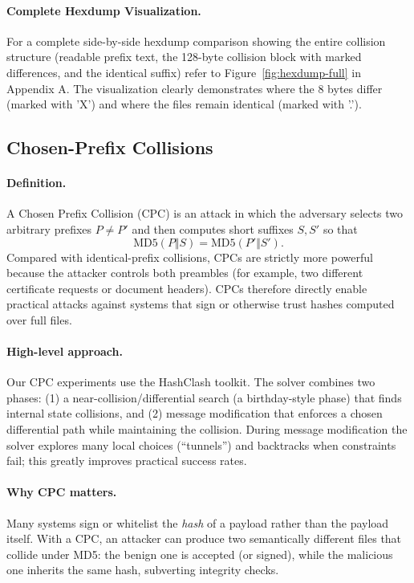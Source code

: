\documentclass[runningheads]{llncs}
\begin{document}
    \paragraph{Complete Hexdump Visualization.}
    For a complete side-by-side hexdump comparison showing the entire collision structure (readable prefix text, the 128-byte collision block with marked differences, and the identical suffix) refer to Figure~\ref{fig:hexdump-full} in Appendix A. The visualization clearly demonstrates where the 8 bytes differ (marked with 'X') and where the files remain identical (marked with '.').

    \subsection{Chosen-Prefix Collisions}\label{sec:cpc}
    \paragraph{Definition.}
    A Chosen Prefix Collision (CPC) is an attack in which the adversary selects two arbitrary prefixes \(P\neq P'\) and then computes short suffixes \(S,S'\) so that
    \[
        \mathrm{MD5}(P\Vert S)=\mathrm{MD5}(P'\Vert S').
    \]
    Compared with identical-prefix collisions, CPCs are strictly more powerful because the attacker controls both preambles (for example, two different certificate requests or document headers). CPCs therefore directly enable practical attacks against systems that sign or otherwise trust hashes computed over full files.

    \paragraph{High-level approach.}
    Our CPC experiments use the HashClash toolkit. The solver combines two phases: (1) a near-collision/differential search (a birthday-style phase) that finds internal state collisions, and (2) message modification that enforces a chosen differential path while maintaining the collision. During message modification the solver explores many local choices (“tunnels”) and backtracks when constraints fail; this greatly improves practical success rates.

    \paragraph{Why CPC matters.}
    Many systems sign or whitelist the \emph{hash} of a payload rather than the payload itself. With a CPC, an attacker can produce two semantically different files that collide under MD5: the benign one is accepted (or signed), while the malicious one inherits the same hash, subverting integrity checks.
\end{document}
